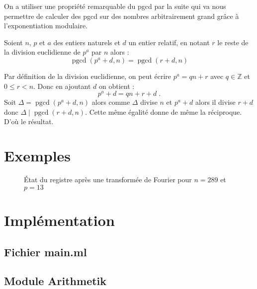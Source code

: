 \documentclass[a4paper,11pt]{tipe}
\DeclareMathOperator{\pgcd}{pgcd}
\newcommand{\Z}{\ensuremath{\mathbb{Z}}}
\begin{document}
On a utiliser une propriété remarquable du pgcd par la suite qui va nous
permettre de calculer des pgcd sur des nombres arbitrairement grand grâce à
l'exponentiation modulaire.
\begin{propriete}
Soient $n$, $p$ et $a$ des entiers naturels et $d$ un entier relatif, en
notant $r$ le reste de la division euclidienne de $p ^ a$ par $n$ alors :
\[ \pgcd( p ^ a + d, n) = \pgcd( r + d, n) \]
\end{propriete}
\begin{demonstration}
Par définition de la division euclidienne, on peut écrire $p ^ a = q n + r$
avec $q \in \Z$ et $ 0 \leq r < n$. Donc en ajoutant $d$ on obtient :
\[ p ^ a + d = q n + r + d \; .\]
Soit $\Delta = \pgcd( p ^ a + d, n)$ alors comme $\Delta$ divise $n$ et $p^a
+d$ alors il divise $r + d$ donc $\Delta \mid \pgcd(r+d,n)$. 
Cette même égalité donne de même la réciproque. D'où le résultat.
\end{demonstration}


\chapter{Exemples}

\begin{figure}
%  
  \caption{État du registre après une transformée de Fourier pour $n = 289$ et
$p = 13$}
\end{figure}
%

\appendix
\chapter{Implémentation}
\section{Fichier main.ml}
\section{Module Arithmetik}
\end{document}
